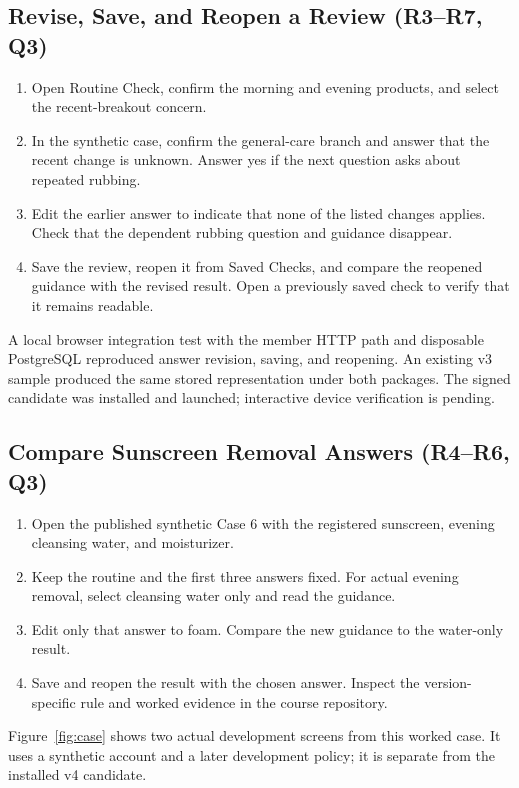 \documentclass[conference,letterpaper]{IEEEtran}
\begin{document}
\subsection{Revise, Save, and Reopen a Review (R3--R7, Q3)}
\begin{enumerate}
\item Open Routine Check, confirm the morning and evening products, and select the recent-breakout concern.
\item In the synthetic case, confirm the general-care branch and answer that the recent change is unknown. Answer yes if the next question asks about repeated rubbing.
\item Edit the earlier answer to indicate that none of the listed changes applies. Check that the dependent rubbing question and guidance disappear.
\item Save the review, reopen it from Saved Checks, and compare the reopened guidance with the revised result. Open a previously saved check to verify that it remains readable.
\end{enumerate}
A local browser integration test with the member HTTP path and disposable PostgreSQL reproduced answer revision, saving, and reopening. An existing v3 sample produced the same stored representation under both packages. The signed candidate was installed and launched; interactive device verification is pending.

\subsection{Compare Sunscreen Removal Answers (R4--R6, Q3)}
\begin{enumerate}
\item Open the published synthetic Case 6 with the registered sunscreen, evening cleansing water, and moisturizer.
\item Keep the routine and the first three answers fixed. For actual evening removal, select cleansing water only and read the guidance.
\item Edit only that answer to foam. Compare the new guidance to the water-only result.
\item Save and reopen the result with the chosen answer. Inspect the version-specific rule and worked evidence in the course repository.
\end{enumerate}
Figure~\ref{fig:case} shows two actual development screens from this worked case. It uses a synthetic account and a later development policy; it is separate from the installed v4 candidate.
\end{document}
